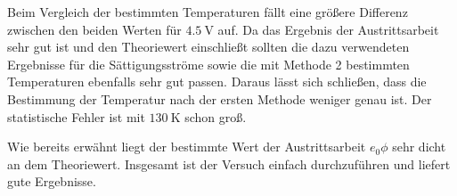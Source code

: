 \documentclass[
  bibliography=totoc,     %
  captions=tableheading,  %
  titlepage=firstiscover, %
]{scrartcl}
\begin{document}
\noindent
Beim Vergleich der bestimmten Temperaturen fällt eine größere Differenz zwischen
den beiden Werten für $\SI{4.5}{\volt}$ auf. Da das Ergebnis der Austrittsarbeit
sehr gut ist und den Theoriewert einschließt sollten die dazu verwendeten
Ergebnisse für die Sättigungsströme sowie die mit Methode 2 bestimmten
Temperaturen ebenfalls sehr gut passen. Daraus lässt sich schließen, dass die
Bestimmung der Temperatur nach der ersten Methode weniger genau ist. Der
statistische Fehler ist mit $\SI{130}{\kelvin}$ schon groß.

\noindent
Wie bereits erwähnt liegt der bestimmte Wert der Austrittsarbeit $e_0 \phi$
sehr dicht an dem Theoriewert.
Insgesamt ist der Versuch einfach durchzuführen und liefert gute Ergebnisse.
\clearpage
\nocite{*}
\printbibliography
\end{document}
